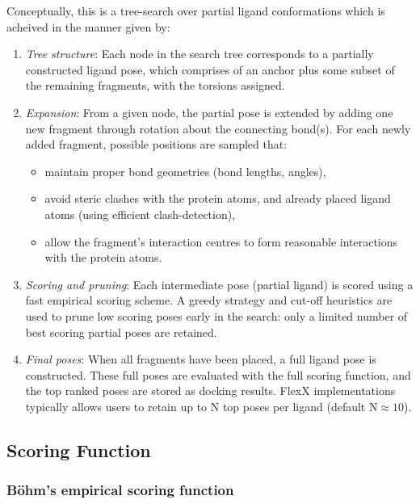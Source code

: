 \documentclass[12pt, a4paper]{article}
\begin{document}
Conceptually, this is a tree-search over partial ligand conformations which is acheived in the manner given by:

\begin{enumerate}
  \item \textit{Tree structure}: Each node in the search tree corresponds to a partially constructed ligand pose, which comprises of an anchor plus some subset of the remaining fragments, with the torsions assigned.

  \item \textit{Expansion}: From a given node, the partial pose is extended by adding one new fragment through rotation about the connecting bond(s). For each newly added fragment, possible positions are sampled that:
        \begin{itemize}
          \item maintain proper bond geometries (bond lengths, angles),
          \item avoid steric clashes with the protein atoms,  and already placed ligand atoms (using efficient clash-detection),
          \item allow the fragment's interaction centres to form reasonable interactions with the protein atoms.
        \end{itemize}

  \item \textit{Scoring and pruning}: Each intermediate pose (partial ligand) is scored using a fast empirical scoring scheme. A greedy strategy and cut-off heuristics are used to prune low scoring poses early in the search: only a limited number of best scoring partial poses are retained.\cite{CH7_rarey1996,CH7_kramer1999}

  \item \textit{Final poses}: When all fragments have been placed, a full ligand pose is constructed. These full poses are evaluated with the full scoring function, and the top ranked poses are stored as docking results. FlexX implementations typically allows users to retain up to N top poses per ligand (default $\text{N} \approx 10$).
\end{enumerate}


\subsection{Scoring Function}

\subsubsection{B{\"o}hm's empirical scoring function}
\end{document}
